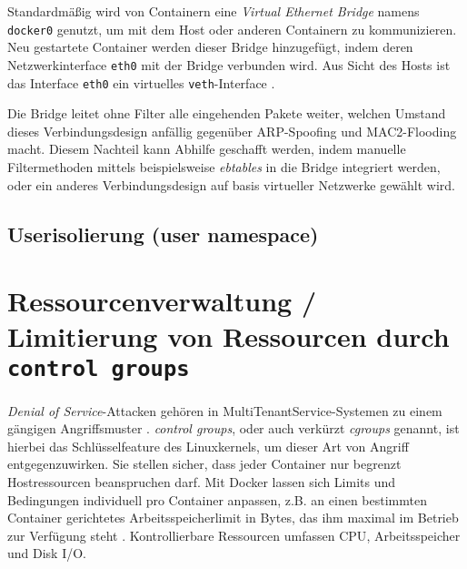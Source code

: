 \documentclass[../main.tex]{subfiles}
\begin{document}
			Standardmäßig wird von Containern eine \emph{Virtual Ethernet Bridge} namens \texttt{docker0} genutzt, um mit dem Host oder anderen Containern zu kommunizieren. Neu gestartete Container werden dieser Bridge hinzugefügt, indem deren Netzwerkinterface \texttt{eth0} mit der Bridge verbunden wird. Aus Sicht des Hosts ist das Interface \texttt{eth0} ein virtuelles \texttt{veth}-Interface \cite[S.3]{virtVSContainer}.

			Die Bridge leitet ohne Filter alle eingehenden Pakete weiter, welchen Umstand dieses Verbindungsdesign anfällig gegenüber \acrshort{ARP}-Spoofing und \acrshort{MAC2}-Flooding macht. Diesem Nachteil kann Abhilfe geschafft werden, indem manuelle Filtermethoden mittels beispielsweise \emph{ebtables} in die Bridge integriert werden, oder ein anderes Verbindungsdesign auf basis virtueller Netzwerke gewählt wird.



			\cite[S.4]{dockerSec1}

    \subsection{Userisolierung (user namespace)}
	\section{Ressourcenverwaltung / Limitierung von Ressourcen durch \texttt{control groups}}
  \label{secResLimit}
		\emph{Denial of Service}-Attacken gehören in \gls{MultiTenantService}-Systemen zu einem gängigen Angriffsmuster \cite[S.5]{dockerSec1}.
		\emph{control groups}, oder auch verkürzt \emph{cgroups} genannt, ist hierbei das Schlüsselfeature des Linuxkernels, um dieser Art von Angriff entgegenzuwirken. Sie stellen sicher, dass jeder Container nur begrenzt Hostressourcen beanspruchen darf. Mit Docker lassen sich Limits und Bedingungen individuell pro Container anpassen, z.B. an einen bestimmten Container gerichtetes Arbeitsspeicherlimit in Bytes, das ihm maximal im Betrieb zur Verfügung steht \cite[S.4]{dockerSecIntro}.
		Kontrollierbare Ressourcen umfassen \acrshort{CPU}, Arbeitsspeicher und Disk I/O.
\end{document}
